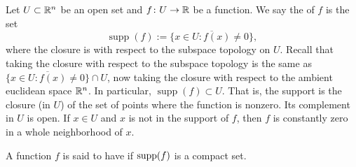 Let $U \subset {\mathbb{R}}^n$ be an open set and
$f \colon U \to {\mathbb{R}}$ be a function.  We say the
\emph{} of $f$ is the set
\begin{equation*}
\operatorname{supp} (f) :=
\overline{
\{ x \in U : f(x) \not= 0 \}
} ,
\end{equation*}
where the closure is with respect to the subspace topology on $U$.
Recall that taking the closure with respect to the subspace
topology is the same as 
$\overline{
\{ x \in U : f(x) \not= 0 \}
} \cap U$, now taking the closure with respect to the ambient euclidean space
${\mathbb{R}}^n$.
In particular,
$\operatorname{supp} (f) \subset U$.
That is, the support is the closure (in $U$) of the set of points where the
function is nonzero.  Its complement in $U$ is open.
If $x \in U$ and $x$ is not in the support of $f$,
then
$f$ is constantly zero in a whole neighborhood of $x$.

A function $f$ is said to have \emph{}
if $\operatorname{supp}(f)$ is a compact set.

